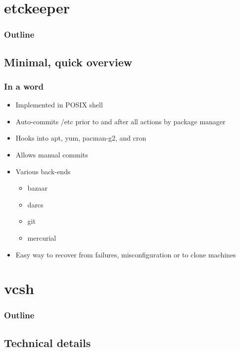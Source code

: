 \documentclass[t]{beamer}
\begin{document}
\section{etckeeper}

\begin{frame}
	\frametitle{Outline}
	\tableofcontents[currentsection]
\end{frame}

\subsection{Minimal, quick overview}

\begin{frame}
	\frametitle{In a word}
	\begin{itemize}
		\item Implemented in POSIX shell
		\item Auto-commits /etc prior to and after all actions by package manager
		\item Hooks into apt, yum, pacman-g2, and cron
		\item Allows manual commits
		\item Various back-ends
		\begin{itemize}
			\item bazaar
			\item darcs
			\item git
			\item mercurial
		\end{itemize}
		\item Easy way to recover from failures, misconfiguration or to clone machines
	\end{itemize}
\end{frame}


\section{vcsh}
\begin{frame}
	\frametitle{Outline}
	\tableofcontents[currentsection]
\end{frame}

\subsection{Technical details}
\end{document}

